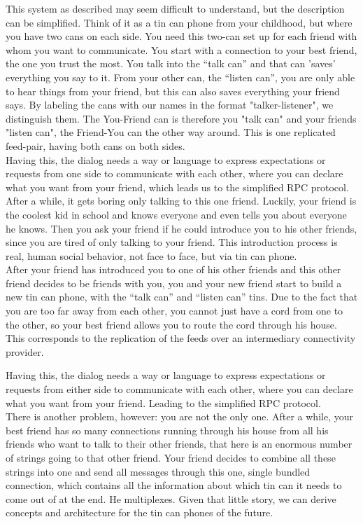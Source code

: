 This system as described may seem difficult to understand, but the description can be simplified. Think of it as a tin can phone from your childhood, but where you have two cans on each side. You need this two-can set up for each friend with whom you want to communicate. You start with a connection to your best friend, the one you trust the most. You talk into the “talk can” and that can ’saves’ everything you say to it. From your other can, the “listen can”, you are only able to hear things from your friend, but this can also saves everything your friend says. By labeling the cans with our names in the format "talker-listener", we distinguish them. The You-Friend can is therefore you "talk can" and your friends "listen can", the Friend-You can the other way around. This is one replicated feed-pair, having both cans on both sides.
\\
Having this, the dialog needs a way or language to express expectations or requests from one side to communicate with each other, where you can declare what you want from your friend, which leads us to the simplified RPC protocol. After a while, it gets boring only talking to this one friend. Luckily, your friend is the coolest kid in school and knows everyone and even tells you about everyone he knows. Then you ask your friend if he could introduce you to his other friends, since you are tired of only talking to your friend. This introduction process is real, human social behavior, not face to face, but via tin can phone.
\\
After your friend has introduced you to one of his other friends and this other friend decides to be friends with you, you and your new friend start to build a new tin can phone, with the “talk can” and “listen can” tins. Due to the fact that you are too far away from each other, you cannot just have a cord from one to the other, so your best friend allows you to route the cord through his house. This corresponds to the replication of the feeds over an intermediary connectivity provider.

Having this, the dialog needs a way or language to express expectations or requests from either side to communicate with each other, where you can declare what you want from your friend. Leading to the simplified RPC protocol.\\ 
There is another problem, however: you are not the only one. After a while, your best friend has so many connections running through his house from all his friends who want to talk to their other friends, that here is an enormous number of strings going to that other friend. Your friend decides to combine all these strings into one and send all messages through this one, single bundled connection, which contains all the information about which tin can it needs to come out of at the end. He multiplexes. Given that little story, we can derive concepts and architecture for the tin can phones of the future.


